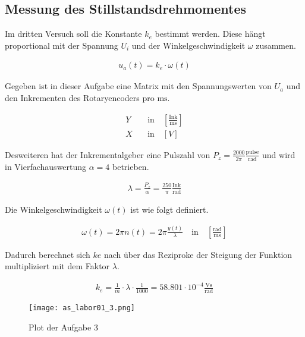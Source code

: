 \subsection{Messung des Stillstandsdrehmomentes}

Im dritten Versuch soll die Konstante $k_e$ bestimmt werden. Diese
hängt proportional mit der Spannung $U_i$ und der Winkelgeschwindigkeit
$\omega$ zusammen.

\begin{equation} \label{eq131}
    \begin{split}
        u_a(t)=k_e \cdot \omega (t)
    \end{split}
\end{equation}

Gegeben ist in dieser Aufgabe eine Matrix mit den Spannungswerten von
$U_a$ und den Inkrementen des Rotaryencoders pro $\mathrm{ms}$.

\begin{equation} \label{eq132}
    \begin{split}
        Y& \quad \text{in} \quad \left[\frac{\mathrm{Ink}}{\mathrm{ms}}\right]\\
        X& \quad \text{in} \quad [V]
    \end{split}
\end{equation}

Desweiteren hat der Inkrementalgeber eine Pulszahl von $P_z=\frac{2000}{2\pi} \mathrm{\frac{pulse}{rad}}$
und wird in Vierfachauswertung $\alpha=4$ betrieben.

\begin{equation} \label{eq133}
    \begin{split}
        \lambda = \frac{P_z}{\alpha} = \frac{250}{\pi} \mathrm{\frac{Ink}{rad}}
    \end{split}
\end{equation}

Die Winkelgeschwindigkeit $\omega(t)$ ist wie folgt definiert.

\begin{equation} \label{eq134}
    \begin{split}
       \omega(t)= 2 \pi n(t)=2 \pi \frac{y(t)}{\lambda} \quad \text{in} \quad \left[\mathrm{\frac{rad}{ms}} \right]
    \end{split}
\end{equation}

Dadurch berechnet sich $ke$ nach über das Reziproke der Steigung der Funktion
multipliziert mit dem Faktor $\lambda$.

\begin{equation} \label{eq134}
    \begin{split}
    k_e = \frac{1}{m} \cdot \lambda \cdot \frac{1}{1000} = 58.801 \cdot 10^{-4} \mathrm{\frac{Vs}{rad}}
    \end{split}
\end{equation}

\begin{figure}[H]
 \centering
 \texttt{[image: as\_labor01\_3.png]}
 \caption{Plot der Aufgabe 3}
 \label{fig:PlotAufgabe3}
\end{figure}